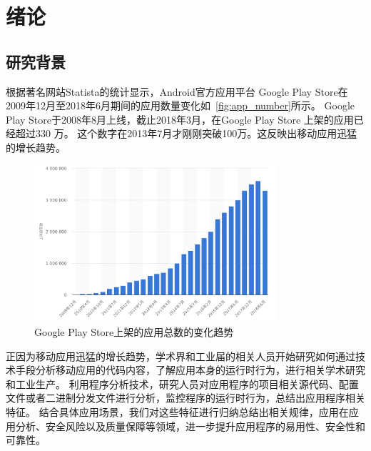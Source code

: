 \chapter {绪论}
\label{chp:intro}

\section{研究背景}

根据著名网站Statista的统计\cite{GoogleP55:online}显示，Android官方应用平台 Google Play Store在2009年12月至2018年6月期间的应用数量变化如~\autoref{fig:app_number}所示。
Google Play Store于2008年8月上线，截止2018年3月，在Google Play Store 上架的应用已经超过330 万。
这个数字在2013年7月才刚刚突破100万。这反映出移动应用迅猛的增长趋势。

\begin{figure}[h]
	\centering
	\includegraphics[width=0.8\textwidth]{./Figures/app-numbers.png}
	\caption{Google Play Store上架的应用总数的变化趋势}
	\label{fig:app_number}
\end{figure}


正因为移动应用迅猛的增长趋势，学术界和工业届的相关人员开始研究如何通过技术手段分析移动应用的代码内容，了解应用本身的运行时行为，进行相关学术研究和工业生产。
利用程序分析技术，研究人员对应用程序的项目相关源代码、配置文件或者二进制分发文件进行分析，监控程序的运行时行为，总结出应用程序相关特征。
结合具体应用场景，我们对这些特征进行归纳总结出相关规律，应用在应用分析、安全风险以及质量保障等领域，进一步提升应用程序的易用性、安全性和可靠性。

